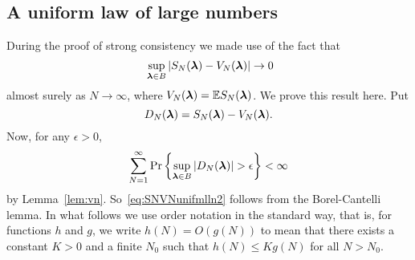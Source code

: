 \documentclass[journal]{IEEEtran}
\begin{document}
 
 
 
% 
 
 
% 
\small 
 


\normalsize
\appendix


\subsection{A uniform law of large numbers} \label{app:uniform-law-large}

During the proof of strong consistency we made use of the fact that
\begin{equation}~\label{eq:SNVNunifmlln2}
\sup_{\lambdabf \in B}\sabs{S_N(\lambdabf) - V_N(\lambdabf)} \rightarrow 0
\end{equation}
almost surely as $N\rightarrow\infty$, where $V_N(\boldsymbol{\lambda}) = {\mathbb E} S_N(\boldsymbol{\lambda})$.  We prove this result here.  Put
\[
D_N(\boldsymbol{\lambda}) = S_N(\boldsymbol{\lambda}) - V_N(\boldsymbol{\lambda}).
\]  
Now, for any $\epsilon > 0$,
\[
\sum_{N=1}^\infty \operatorname{Pr} \left\{ \sup_{\boldsymbol{\lambda} \in B}\left\vert  D_N(\boldsymbol{\lambda})  \right\vert > \epsilon \right\} < \infty
\]
by Lemma~\ref{lem:vn}.  So~\eqref{eq:SNVNunifmlln2} follows from the Borel-Cantelli lemma.   In what follows we use order notation in the standard way, that is, for functions $h$ and $g$, we write $h(N) = O(g(N))$ to mean that there exists a constant $K > 0$ and a finite $N_0$ such that $h(N) \leq K g(N)$ for all $N > N_0$.
\end{document}
